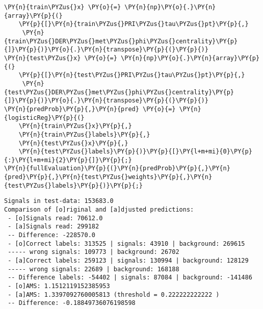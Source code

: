 {\par%
\vspace{-1\baselineskip}%
}%
\begin{notebookcell}[]%
\begin{addmargin}[\cellleftmargin]{0em}%
{\smaller%
\par%
%
\vspace{-1\smallerfontscale}%
\begin{Verbatim}[commandchars=\\\{\}]
\PY{n}{train\PYZus{}x} \PY{o}{=} \PY{n}{np}\PY{o}{.}\PY{n}{array}\PY{p}{(}
    \PY{p}{[}\PY{n}{train\PYZus{}PRI\PYZus{}tau\PYZus{}pt}\PY{p}{,}
     \PY{n}{train\PYZus{}DER\PYZus{}met\PYZus{}phi\PYZus{}centrality}\PY{p}{]}\PY{p}{)}\PY{o}{.}\PY{n}{transpose}\PY{p}{(}\PY{p}{)}
\PY{n}{test\PYZus{}x} \PY{o}{=} \PY{n}{np}\PY{o}{.}\PY{n}{array}\PY{p}{(}
    \PY{p}{[}\PY{n}{test\PYZus{}PRI\PYZus{}tau\PYZus{}pt}\PY{p}{,}
     \PY{n}{test\PYZus{}DER\PYZus{}met\PYZus{}phi\PYZus{}centrality}\PY{p}{]}\PY{p}{)}\PY{o}{.}\PY{n}{transpose}\PY{p}{(}\PY{p}{)}
\PY{n}{predProb}\PY{p}{,}\PY{n}{pred} \PY{o}{=} \PY{n}{logisticReg}\PY{p}{(}
    \PY{n}{train\PYZus{}x}\PY{p}{,}
    \PY{n}{train\PYZus{}labels}\PY{p}{,}
    \PY{n}{test\PYZus{}x}\PY{p}{,}
    \PY{n}{test\PYZus{}labels}\PY{p}{)}\PY{p}{[}\PY{l+m+mi}{0}\PY{p}{:}\PY{l+m+mi}{2}\PY{p}{]}\PY{p}{;}
\PY{n}{fullEvaluation}\PY{p}{(}\PY{n}{predProb}\PY{p}{,}\PY{n}{pred}\PY{p}{,}\PY{n}{test\PYZus{}weights}\PY{p}{,}\PY{n}{test\PYZus{}labels}\PY{p}{)}\PY{p}{;}
\end{Verbatim}
%
\par%
\vspace{-1\smallerfontscale}}%
\end{addmargin}
\end{notebookcell}

\par\vspace{1\smallerfontscale}%
    \begin{addmargin}[\cellleftmargin]{0em}%
    {\smaller%
    \vspace{-1\smallerfontscale}%
    
    \begin{Verbatim}[commandchars=\\\{\}]
Signals in test-data: 153683.0
Comparison of [o]riginal and [a]djusted predictions:
 - [o]Signals read: 70612.0 
 - [a]Signals read: 299182 
 -- Difference: -228570.0 
 - [o]Correct labels: 313525 | signals: 43910 | background: 269615 
 ----- wrong signals: 109773 | background: 26702 
 - [a]Correct labels: 259123 | signals: 130994 | background: 128129 
 ----- wrong signals: 22689 | background: 168188 
 -- Difference labels: -54402 | signals: 87084 | background: -141486 
 - [o]AMS: 1.1512119152385953 
 - [a]AMS: 1.3397092760005813 (threshold = 0.222222222222 )
 -- Difference: -0.18849736076198598
    \end{Verbatim}
}%
    \end{addmargin}%


